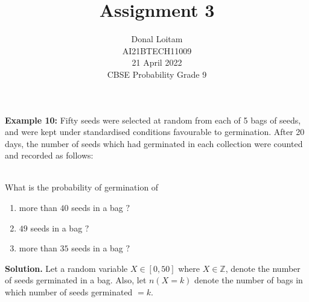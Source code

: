 \documentclass[journal,12pt,twocolumn]{IEEEtran}
\title{Assignment 3}
\author{Donal Loitam \\ \normalsize AI21BTECH11009 \\ \vspace*{20pt} \normalsize  21 April 2022 \\ \vspace*{20pt} \Large CBSE Probability Grade 9}
\begin{document}
	\maketitle
	
	\textbf{Example 10:}
	 Fifty seeds were selected at random from each of 5 bags of seeds, and
were kept under standardised conditions favourable to germination. After 20 days, the number of seeds which had germinated in each collection were counted and recorded as follows:\\
\begin{table}[ht!]
\begin{center}
		
		\vspace*{5pt}
		\caption{}
		\label{table:table1}
\end{center}	
	\end{table}\\
What is the probability of germination of
\begin{enumerate}[label=(\roman*)]
    \item more than $40$ seeds in a bag $?$
 	\item $49$ seeds in a bag $?$
 	\item more than $35$ seeds in a bag $?$
    \end{enumerate}
    
	\textbf{Solution.}
	Let a random variable $X \in [0,50]$ where $X \in \mathbb{Z}$, denote the number of seeds germinated in a bag. Also, let $n(X = k)$ denote the number of bags in which number of seeds germinated $=k$.
\end{document}
